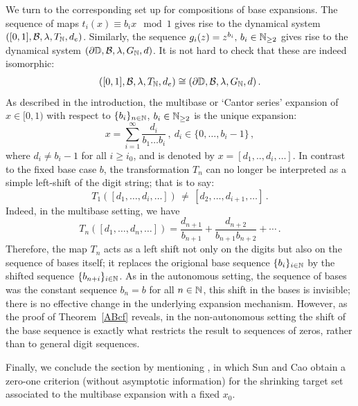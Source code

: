 \documentclass[11pt,reqno]{amsart}
\newcommand{\N}{{\Bbb N}}
\newcommand{\D}{{\Bbb D}}
\newcommand{\0}{\mathbf{0}}
\theoremstyle{remark}
\numberwithin{equation}{section}
\theoremstyle{remark}
\numberwithin{equation}{section}
\begin{document}
We turn to the corresponding set up for compositions of base expansions. The sequence of maps $t_i(x)\equiv b_i x \mod 1$ gives rise to the dynamical system $([0,1], \mathcal{B}, \lambda, T_{\N}, d_{e})$. Similarly, the sequence
 $g_i(z)=z^{b_i}, \, b_i \in \N_{\geq 2}$ gives rise to the dynamical system $(\partial \D, \mathcal{B},\lambda, G_{\N}, d)$. It is not hard to check that these are indeed isomorphic: 
 \begin{eqnarray}\label{iso}
     ([0,1], \mathcal{B}, \lambda, T_{\N}, d_e) \cong (\partial \D, \mathcal{B}, \lambda, G_{\N}, d) \, .
 \end{eqnarray}
 As described in the introduction, the multibase or `Cantor series' expansion of $x \in [0,1)$ with respect to $\{b_i\}_{n \in \N}$, $b_i \in \N_{\geq 2}$ is the unique expansion:
$$
x = \sum_{i=1}^{\infty} \frac{d_i}{b_1\dots b_i} \, , \  d_i \in \{0,\dots,b_i-1\}  \, ,
$$
where $d_i \neq b_i -1$ for all $i\geq i_0$, and is denoted by $x= [d_1,..,d_i,\dots]$. 
In contrast to the fixed base case $b$, the transformation $T_n$ can no longer be interpreted as a simple left-shift of the digit string; that is to say:
$$
T_1([d_1,\dots,d_i,\dots]) \, \neq \, [d_2,\dots,d_{i+1},\dots] \, .
$$
Indeed, in the multibase setting, we have $$T_n( [d_1,\ldots,d_n,\ldots] ) = \frac{ d_{n+1} }{ b_{n+1} } + \frac{ d_{n+2} }{ b_{n+1} b_{n+2} } + \cdots \, .$$
Therefore, the map $T_n$ acts as a left shift not only on the digits but also on the sequence of bases itself; it replaces the origional base sequence $\{b_i\}_{i \in \N}$ by the shifted sequence $ \{b_{n+i}\}_{i \in \N}$. As in the autonomous setting, the sequence of bases was the constant sequence $b_n=b$ for all $n \in \N$, this shift in the bases is invisible; there is no effective change in the underlying expansion mechanism. However, as the proof of Theorem~\ref{ABcf} reveals, in the non-autonomous setting the shift of the base sequence is exactly what restricts the result to sequences of zeros, rather than to general digit sequences.

Finally, we conclude the section by mentioning \cite[Theorem~1.1]{Sun}, in which Sun and Cao obtain a zero-one criterion (without asymptotic information) for the shrinking target set associated to the multibase expansion with a fixed $x_0$.
\medskip
\end{document}
